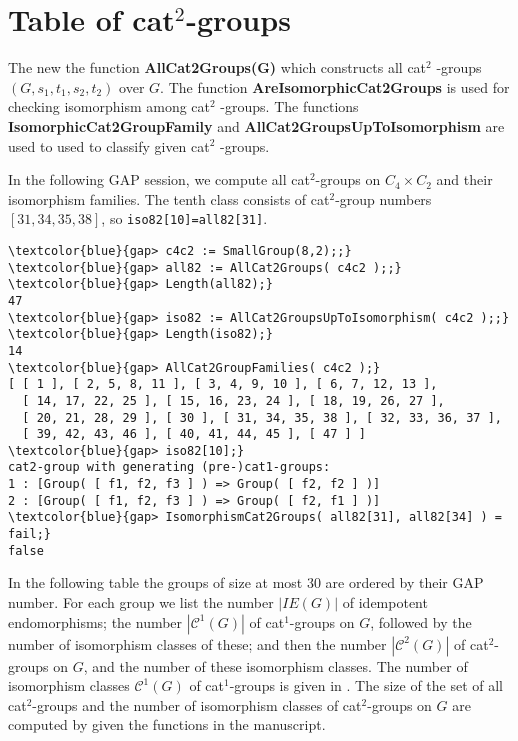 \documentclass[a4paper,11pt]{article}
\theoremstyle{plain}
\theoremstyle{definition}
\begin{document}
\section{Table of cat$^{2}$-groups}

The new the function \textbf{AllCat2Groups(G)} which constructs all cat$^{2}$%
-groups $(G,s_1,t_1,s_2,t_2)$ over $G$. The function \textbf{%
	AreIsomorphicCat2Groups} is used for checking isomorphism among cat$^{2}$%
-groups. The functions \textbf{IsomorphicCat2GroupFamily} and \textbf{%
	AllCat2GroupsUpToIsomorphism} are used to used to classify given cat$^{2}$%
-groups.

In the following \textsf{GAP} session, we compute all cat$^{2}$-groups on $C_{4}
\times C_{2}$ and their isomorphism families. 
The tenth class consists of cat$^2$-group numbers $[31,34,35,38]$, 
so \texttt{iso82[10]=all82[31]}. 

\begin{Verbatim}[frame=single, fontsize=\small, commandchars=\\\{\}]
\textcolor{blue}{gap> c4c2 := SmallGroup(8,2);;}
\textcolor{blue}{gap> all82 := AllCat2Groups( c4c2 );;}
\textcolor{blue}{gap> Length(all82);}
47
\textcolor{blue}{gap> iso82 := AllCat2GroupsUpToIsomorphism( c4c2 );;}
\textcolor{blue}{gap> Length(iso82);}
14
\textcolor{blue}{gap> AllCat2GroupFamilies( c4c2 );}
[ [ 1 ], [ 2, 5, 8, 11 ], [ 3, 4, 9, 10 ], [ 6, 7, 12, 13 ], 
  [ 14, 17, 22, 25 ], [ 15, 16, 23, 24 ], [ 18, 19, 26, 27 ], 
  [ 20, 21, 28, 29 ], [ 30 ], [ 31, 34, 35, 38 ], [ 32, 33, 36, 37 ], 
  [ 39, 42, 43, 46 ], [ 40, 41, 44, 45 ], [ 47 ] ]
\textcolor{blue}{gap> iso82[10];}
cat2-group with generating (pre-)cat1-groups:
1 : [Group( [ f1, f2, f3 ] ) => Group( [ f2, f2 ] )]
2 : [Group( [ f1, f2, f3 ] ) => Group( [ f2, f1 ] )]
\textcolor{blue}{gap> IsomorphismCat2Groups( all82[31], all82[34] ) = fail;}
false
\end{Verbatim}

In the following table the groups of size at most $30$ are ordered by their
\textsf{GAP} number. 
For each group we list the number $|IE(G)|$ of idempotent endomorphisms; 
the number $|\mathcal{C}^1(G)|$ of cat$^1$-groups on $G$, 
followed by the number of isomorphism classes of these; 
and then the number $|\mathcal{C}^2(G)|$ of cat$^2$-groups on $G$, 
and the number of these isomorphism classes. 
The number of isomorphism classes $\mathcal{C}^1(G)$ of cat$^{1}$-groups 
is given in \cite{alp2}. 
The size of the set of all cat$^{2}$-groups and the number of isomorphism classes 
of cat$^{2}$-groups on $G$ are computed by given the functions in the manuscript.
\end{document}
